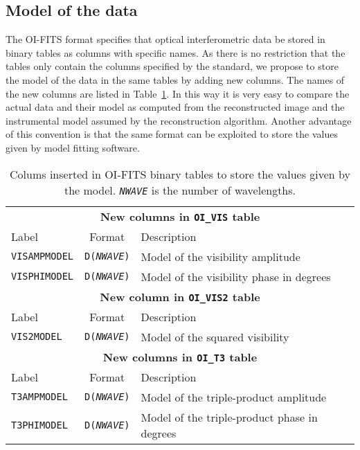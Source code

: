 \documentclass{article}
\newcommand*{\ROW}{} %
\newcommand*{\ROWTITLE}{} %
\begin{document}
\subsection{Model of the data}

The OI-FITS format \citep{Pauls_et_al-2005-oifits} specifies that optical
interferometric data be stored in binary tables as columns with specific
names.  As there is no restriction that the tables only contain the columns
specified by the standard, we propose to store the model of the data in the
same tables by adding new columns.  The names of the new columns are listed in
Table~\ref{tab:model-columns}.  In this way it is very easy to compare the
actual data and their model as computed from the reconstructed image and the
instrumental model assumed by the reconstruction algorithm.  Another advantage
of this convention is that the same format can be exploited to store the
values given by model fitting software.

\renewcommand{\ROW}[2]{\texttt{#1} & \texttt{D(\textsl{NWAVE})} & #2 \\}
\renewcommand{\ROWTITLE}[1]{\multicolumn{3}{c}{\textbf{#1}}\\}

\begin{table}
\caption{Colums inserted in OI-FITS binary tables to store the values given by
the model.  \texttt{\textsl{NWAVE}} is the number of wavelengths.
\label{tab:model-columns}}
\begin{tabular}{lcl}
\hline
\hline
\ROWTITLE{New columns in \texttt{OI\_VIS} table}
Label & Format & Description \\
\hline
\ROW{VISAMPMODEL}{Model of the visibility amplitude}
\ROW{VISPHIMODEL}{Model of the visibility phase in degrees}
\hline
\hline
\ROWTITLE{New column in \texttt{OI\_VIS2} table}
Label & Format & Description \\
\hline
\ROW{VIS2MODEL}{Model of the squared visibility}
\hline
\hline
\ROWTITLE{New columns in \texttt{OI\_T3} table}
Label & Format & Description \\
\hline
\ROW{T3AMPMODEL}{Model of the triple-product amplitude}
\ROW{T3PHIMODEL}{Model of the triple-product phase in degrees}
\hline
\end{tabular}
\end{table}



\end{document}
